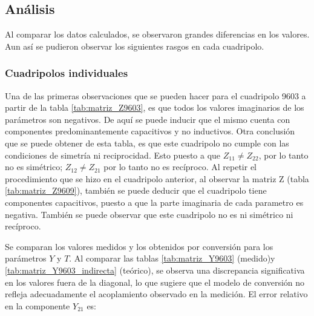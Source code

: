 \subsection{Análisis}

Al comparar los datos calculados, se observaron grandes diferencias en los valores. Aun así se pudieron observar los siguientes rasgos en cada cuadripolo.

\subsubsection{Cuadripolos individuales}


Una de las primeras observaciones que se pueden hacer para el cuadripolo 9603 a partir de la tabla \ref{tab:matriz_Z9603}, es que todos los valores imaginarios de los parámetros son negativos. De aquí se puede inducir que el mismo cuenta con componentes predominantemente capacitivos y no inductivos. Otra conclusión que se puede obtener de esta tabla, es que este cuadripolo no cumple con las condiciones de simetría ni reciprocidad. Esto puesto a que $Z_{11} \neq Z_{22}$, por lo tanto no es simétrico; $Z_{12} \neq Z_{21}$ por lo tanto no es recíproco.
Al repetir el procedimiento que se hizo en el cuadripolo anterior, al observar la matriz Z (tabla \ref{tab:matriz_Z9609}), también se puede deducir que el cuadripolo tiene componentes capacitivos, puesto a que la parte imaginaria de cada parametro es negativa. También se puede observar que este cuadripolo no es ni simétrico ni recíproco. 

Se comparan los valores medidos y los obtenidos por conversión para los parámetros $Y$ y $T$. Al comparar las tablas \ref{tab:matriz_Y9603} (medido)y \ref{tab:matriz_Y9603_indirecta} (teórico), se observa una discrepancia significativa en los valores fuera de la diagonal, lo que sugiere que el modelo de conversión no refleja adecuadamente el acoplamiento observado en la medición. El error relativo en la componente $Y_{21}$ es:







